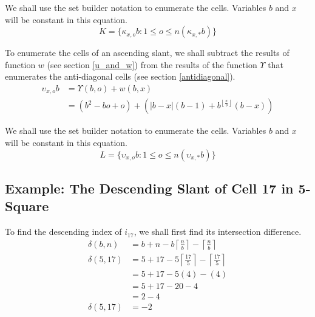 \documentclass[letterpaper, twoside,12pt]{article}
\begin{document}
    We shall use the set builder notation to enumerate the cells. Variables $b$ and $x$ will be constant in this equation.
    \begin{equation}
        K = \{ \kappa_{x,o}b : 1 \leq o \leq n(\kappa_{x,*}b) \}
    \end{equation}

    To enumerate the cells of an ascending slant, we shall subtract the results of function $w$ (see section \ref{u_and_w}) from the results of the function $\Upsilon$ that enumerates the anti-diagonal cells (see section \ref{antidiagonal}).
    \begin{equation}
        \begin{split}
            \upsilon_{x,o}b &= \Upsilon(b,o) + w(b,x) \\
                &= (b^2 - bo + o) + (|b-x|(b-1)+ b^{\left\lfloor \frac{x}{b} \right\rfloor}(b-x))
        \end{split}
    \end{equation}

    We shall use the set builder notation to enumerate the cells. Variables $b$ and $x$ will be constant in this equation.
    \begin{equation}
        L = \{ \upsilon_{x,o}b : 1 \leq o \leq n(\upsilon_{x,*}b) \}
    \end{equation}

    \subsection{Example: The Descending Slant of Cell 17 in 5-Square} \label{3-4_example_1}
    To find the descending index of $i_{17}$, we shall first find its intersection difference.
    \begin{equation*}
        \begin{split}
            \delta(b,n) &= b + n - b\left\lceil \frac{n}{b} \right\rceil - \left\lceil \frac{n}{b} \right\rceil\\
            \delta(5,17) &= 5 + 17 - 5\left\lceil \frac{17}{5} \right\rceil - \left\lceil \frac{17}{5} \right\rceil\\
                &= 5 + 17 - 5(4) - (4)\\
                &= 5 + 17 - 20 - 4\\
                &= 2 - 4\\
            \delta(5,17) &= -2\\
        \end{split}
    \end{equation*}
\end{document}

